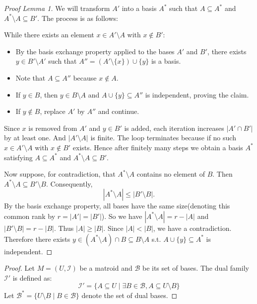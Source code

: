 \documentclass[12pt,a4paper]{article}
\theoremstyle{definition}
\begin{document}
\begin{enumerate}
\begin{enumerate}
\begin{proof}[Proof Lemma 1]
            We will transform $A'$ into a basis $A^*$ such that $A \subseteq A^*$ and $A^* \setminus A \subseteq B'$. The process is as follows:
        
            While there exists an element $x \in A' \setminus A$ with $x \notin B'$:
            \begin{itemize}
                \item By the basis exchange property applied to the bases $A'$ and $B'$, there exists $y \in B' \setminus A'$ such that $A'' = (A' \setminus \{x\}) \cup \{y\}$ is a basis.
                \item Note that $A \subseteq A''$ because $x \notin A$.
                \item If $y \in B$, then $y \in B \setminus A$ and $A \cup \{y\} \subseteq A''$ is independent, proving the claim.
                \item If $y \notin B$, replace $A'$ by $A''$ and continue.
            \end{itemize}
        
            Since $x$ is removed from $A'$ and $y \in B'$ is added, each iteration increases $|A' \cap B'|$ by at least one.
            And $|A' \setminus A|$ is finite. The loop terminates because if no such $ x \in A' \setminus A $ with $ x \notin B' $ exists. Hence after finitely many steps we obtain a basis $A^*$ satisfying $A \subseteq A^*$ and $A^* \setminus A \subseteq B'$.
        
            Now suppose, for contradiction, that $A^* \setminus A$ contains no element of $B$. Then $A^* \setminus A \subseteq B' \setminus B$. Consequently,
            \[
            |A^* \setminus A| \le |B' \setminus B|.
            \]
            By the basis exchange property, all bases have the same size(denoting this common rank by $r = |A'| = |B'|$). So we have $|A^* \setminus A| = r - |A|$ and $|B' \setminus B| = r - |B|$. Thus $|A| \ge |B|$. Since $|A| < |B|$, we have a contradiction. Therefore there exists $y \in (A^* \setminus A) \cap B \subseteq B \setminus A$ s.t. $A \cup \{y\} \subseteq A^*$ is independent.
        \end{proof}


    \begin{proof}
        Let $M = (U, \mathcal{I})$ be a matroid and $\mathcal{B}$ be its set of bases. The dual family $\mathcal{I}'$ is defined as:
        $$\mathcal{I}' = \{ A \subseteq U \mid \exists B \in \mathcal{B}, A \subseteq U \setminus B \}$$
        Let $\mathcal{B}^* = \{ U \setminus B \mid B \in \mathcal{B} \}$ denote the set of dual bases.
        

\end{proof}
\end{enumerate}
\end{enumerate}
\end{document}

